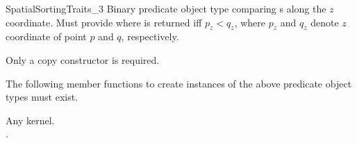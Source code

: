 \begin{ccRefConcept}{SpatialSortingTraits_3}
%
       {Binary predicate object type comparing s
        along the $z$ coordinate.
        Must provide 
         where 
        is returned iff $p_z < q_z$,
        where $p_z$ and $q_z$ denote $z$ coordinate of point $p$ and $q$,
        respectively.
       }


\ccCreation
{}  %

Only a copy constructor is required.


\ccOperations

The following member functions to create instances of the above predicate
object types must exist. 

\setlength\parskip{0mm}
\ccGlue
{}
\ccGlue 
{}
\ccGlue
{}
\ccGlue
{}
\ccGlue
{}

\ccParDims
\ccHasModels

Any \cgal{} kernel.\\
.

\ccParDims
\end{ccRefConcept}


